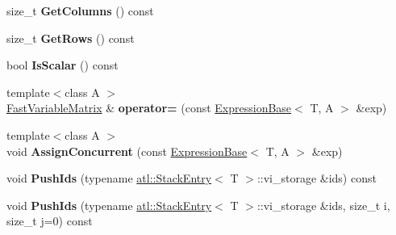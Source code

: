 \begin{DoxyCompactItemize}
\item 
\hypertarget{structatl_1_1_fast_variable_matrix_a3bcd59b609b8006a5c2713df4a5f01d1}{size\+\_\+t {\bfseries Get\+Columns} () const }\label{structatl_1_1_fast_variable_matrix_a3bcd59b609b8006a5c2713df4a5f01d1}

\item 
\hypertarget{structatl_1_1_fast_variable_matrix_a5f4d637293bd81840200afe3cbbb468d}{size\+\_\+t {\bfseries Get\+Rows} () const }\label{structatl_1_1_fast_variable_matrix_a5f4d637293bd81840200afe3cbbb468d}

\item 
\hypertarget{structatl_1_1_fast_variable_matrix_a2d095dbef161ab6e752fe26d36368d30}{bool {\bfseries Is\+Scalar} () const }\label{structatl_1_1_fast_variable_matrix_a2d095dbef161ab6e752fe26d36368d30}

\item 
\hypertarget{structatl_1_1_fast_variable_matrix_afa01a66af96313c199bc2aa6e7f0fa74}{{\footnotesize template$<$class A $>$ }\\\hyperlink{structatl_1_1_fast_variable_matrix}{Fast\+Variable\+Matrix} \& {\bfseries operator=} (const \hyperlink{structatl_1_1_expression_base}{Expression\+Base}$<$ T, A $>$ \&exp)}\label{structatl_1_1_fast_variable_matrix_afa01a66af96313c199bc2aa6e7f0fa74}

\item 
\hypertarget{structatl_1_1_fast_variable_matrix_a227d98f3a20e3fcd8cf6a29a5616b5f3}{{\footnotesize template$<$class A $>$ }\\void {\bfseries Assign\+Concurrent} (const \hyperlink{structatl_1_1_expression_base}{Expression\+Base}$<$ T, A $>$ \&exp)}\label{structatl_1_1_fast_variable_matrix_a227d98f3a20e3fcd8cf6a29a5616b5f3}

\item 
\hypertarget{structatl_1_1_fast_variable_matrix_a8af9c6e87cfd817ab521eb4835b7317a}{void {\bfseries Push\+Ids} (typename \hyperlink{structatl_1_1_stack_entry}{atl\+::\+Stack\+Entry}$<$ T $>$\+::vi\+\_\+storage \&ids) const }\label{structatl_1_1_fast_variable_matrix_a8af9c6e87cfd817ab521eb4835b7317a}

\item 
\hypertarget{structatl_1_1_fast_variable_matrix_ab6eedc4ee8dd784c0e72d77ab018439b}{void {\bfseries Push\+Ids} (typename \hyperlink{structatl_1_1_stack_entry}{atl\+::\+Stack\+Entry}$<$ T $>$\+::vi\+\_\+storage \&ids, size\+\_\+t i, size\+\_\+t j=0) const }\label{structatl_1_1_fast_variable_matrix_ab6eedc4ee8dd784c0e72d77ab018439b}


\end{DoxyCompactItemize}
